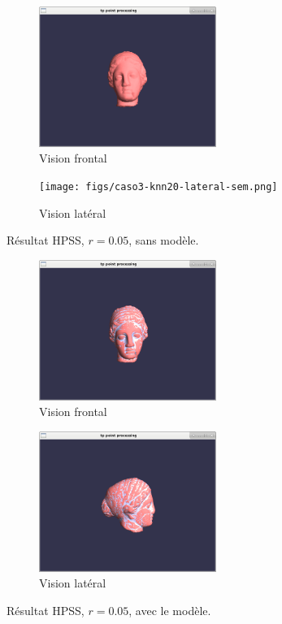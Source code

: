 \documentclass[a4,12pt]{report}
\begin{document}
\begin{figure}[!h]
	\centering
	\begin{subfigure}[b]{0.5\textwidth}
		\centering
		\includegraphics[height=1.8in]{figs/caso3-knn20-frontal-sem.png}
		\caption{Vision frontal}
	\end{subfigure}%
	\begin{subfigure}[b]{0.5\textwidth}
		\centering
		\texttt{[image: figs/caso3-knn20-lateral-sem.png]}
		\caption{Vision latéral}
	\end{subfigure}
	\caption{Résultat HPSS, $r=0.05$,  sans modèle.}
	\label{fig:5}
\end{figure}
\begin{figure}[!h]
	\centering
	\begin{subfigure}[b]{0.5\textwidth}
		\centering
		\includegraphics[height=1.8in]{figs/caso3-knn20-frontal-com.png}
		\caption{Vision frontal}
	\end{subfigure}%
	\begin{subfigure}[b]{0.5\textwidth}
		\centering
		\includegraphics[height=1.8in]{figs/caso3-knn20-lateral-com.png}
		\caption{Vision latéral}
	\end{subfigure}
	\label{fig:6}
	\caption{Résultat HPSS, $r=0.05$, avec le modèle.}
\end{figure}
\end{document}
